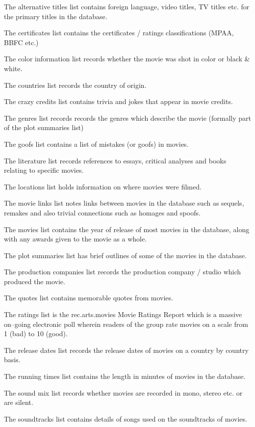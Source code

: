 The alternative titles list contains foreign language, video titles, TV 
titles
etc. for the primary titles in the database.

The certificates list contains the certificates / ratings classifications
(MPAA, BBFC etc.)

The color information list records whether the movie was shot in color or
black \& white.

The countries list records the country of origin.

The crazy credits list contains trivia and jokes that appear in movie 
credits.

The genres list records records the genres which describe the movie 
(formally
part of the plot summaries list)

The goofs list contains a list of mistakes (or goofs) in movies.

The literature list records references to essays, critical analyses and books
relating to specific movies.

The locations list holds information on where movies were filmed.
 
The movie links list notes links between movies in the database such as 
sequels, remakes and also trivial connections such as homages and spoofs.

The movies list contains the year of release of most movies in the 
database,
along with any awards given to the movie as a whole.

The plot summaries list has brief outlines of some of the movies in the
database.

The production companies list records the production company / studio 
which 
produced the movie.

The quotes list contains memorable quotes from movies.

The ratings list is the rec.arts.movies Movie Ratings Report which is a
massive on--going electronic poll wherein readers of the group rate movies
on a scale from 1 (bad) to 10 (good).

The release dates list records the release dates of movies on a country by 
country basis.

The running times list contains the length in minutes of movies in the 
database.

The sound mix list records whether movies are recorded in mono, stereo etc.
or are silent.

The soundtracks list contains details of songs used on the soundtracks
of movies.

